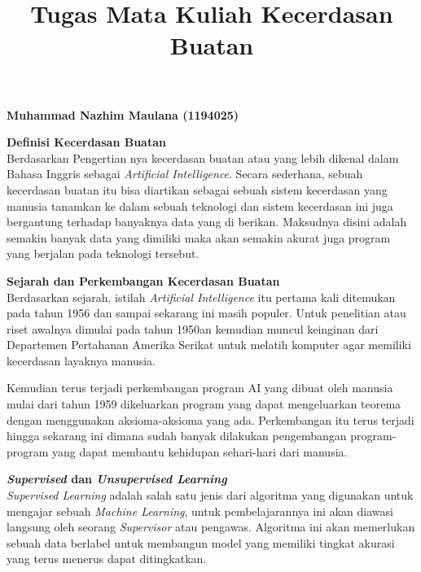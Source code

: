 \documentclass{report}
\begin{document}
\title{Tugas Mata Kuliah Kecerdasan Buatan}
\maketitle

{\bf Muhammad Nazhim Maulana (1194025)}
\vspace{0.1cm}

{\bf Definisi Kecerdasan Buatan}
\vspace{0.1cm}
\\\hangindent=0.5cm Berdasarkan Pengertian nya kecerdasan buatan atau yang lebih dikenal dalam Bahasa Inggris sebagai \emph{Artificial Intelligence}. Secara sederhana, sebuah kecerdasan buatan itu bisa diartikan sebagai sebuah sistem kecerdasan yang manusia tanamkan ke dalam sebuah teknologi dan sistem kecerdasan ini juga bergantung terhadap banyaknya data yang di berikan. Maksudnya disini adalah semakin banyak data yang dimiliki maka akan semakin akurat juga program yang berjalan pada teknologi tersebut.

\vspace{0.5cm}

{\bf Sejarah dan Perkembangan Kecerdasan Buatan}
\vspace{0.1cm}
\\\hangindent=0.5cm Berdasarkan sejarah, istilah \emph{Artificial Intelligence} itu pertama kali ditemukan pada tahun 1956 dan sampai sekarang ini masih populer. Untuk penelitian atau riset awalnya dimulai pada tahun 1950an kemudian muncul keinginan dari Departemen Pertahanan Amerika Serikat untuk melatih komputer agar memiliki kecerdasan layaknya manusia.

\vspace{0.4cm}
\hangindent=0.5cm Kemudian terus terjadi perkembangan program AI yang dibuat oleh manusia mulai dari tahun 1959 dikeluarkan program yang dapat mengeluarkan teorema dengan menggunakan aksioma-aksioma yang ada. Perkembangan itu terus terjadi hingga sekarang ini dimana sudah banyak dilakukan pengembangan program-program yang dapat membantu kehidupan sehari-hari dari manusia.

\vspace{0.5cm}

{\bf \emph{Supervised} dan \emph{Unsupervised Learning}}
\vspace{0.1cm}
\\\hangindent=0.5cm \emph{Supervised Learning} adalah salah satu jenis dari algoritma yang digunakan untuk mengajar sebuah \emph{Machine Learning}, untuk pembelajarannya ini akan diawasi langsung oleh seorang \emph{Supervisor} atau pengawas. Algoritma ini akan memerlukan sebuah data berlabel untuk membangun model yang memiliki tingkat akurasi yang terus menerus dapat ditingkatkan.
\end{document}
